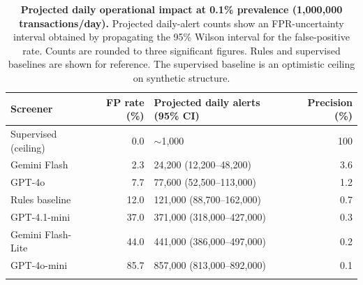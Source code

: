 \documentclass[pdflatex,sn-basic,Numbered]{sn-jnl}
\begin{document}
\begin{table}[t]
\caption{\textbf{Projected daily operational impact at 0.1\% prevalence (1,000,000 transactions/day).} Projected daily-alert counts show an FPR-uncertainty interval obtained by propagating the 95\% Wilson interval for the false-positive rate. Counts are rounded to three significant figures. Rules and supervised baselines are shown for reference. The supervised baseline is an optimistic ceiling on synthetic structure.}\label{tab:vol}
\begin{tabular}{@{}lrlr@{}}
\toprule
Screener & FP rate (\%) & Projected daily alerts (95\% CI) & Precision (\%) \\
\midrule
Supervised (ceiling) & 0.0  & $\sim$1{,}000                    & 100 \\
Gemini Flash         & 2.3 & 24{,}200 (12{,}200--48{,}200) & 3.6 \\
GPT-4o               & 7.7 & 77{,}600 (52{,}500--113{,}000) & 1.2 \\
Rules baseline       & 12.0 & 121{,}000 (88{,}700--162{,}000) & 0.7 \\
GPT-4.1-mini         & 37.0 & 371{,}000 (318{,}000--427{,}000) & 0.3 \\
Gemini Flash-Lite    & 44.0 & 441{,}000 (386{,}000--497{,}000) & 0.2 \\
GPT-4o-mini          & 85.7 & 857{,}000 (813{,}000--892{,}000) & 0.1 \\
\botrule
\end{tabular}
\end{table}
\end{document}
